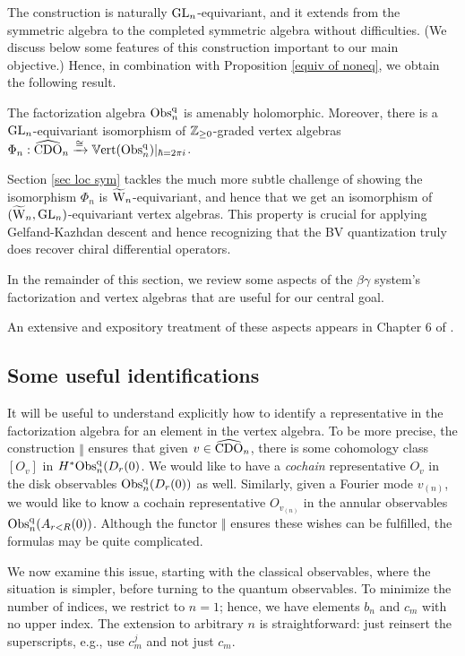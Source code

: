 The construction is naturally ${\rm GL}_n$-equivariant, and 
it extends from the symmetric algebra to the completed symmetric algebra without difficulties.
(We discuss below some features of this construction important to our main objective.)
Hence, in combination with Proposition \ref{equiv of noneq},
we obtain the following result.

\begin{cor}
The factorization algebra ${\rm Obs}^{\rm q}_n$ is amenably holomorphic. 
Moreover, there is a ${\rm GL}_n$-equivariant isomorphism of $\mathbb Z_{\geq 0}$-graded vertex algebras 
$\Phi_n : \widehat{\rm CDO}_n \xrightarrow{\cong} \mathbb{V}{\rm ert}({\rm Obs}^{\rm q}_n)|_{\hbar= 2 \pi i}$.
\end{cor}

Section \ref{sec loc sym} tackles the much more subtle challenge of showing the isomorphism $\Phi_n$ is $\widetilde{{{\rm W}}}_n$-equivariant,
and hence that we get an isomorphism of $(\widetilde{{{\rm W}}}_n,{\rm GL}_n)$-equivariant vertex algebras.
This property is crucial for applying Gelfand-Kazhdan descent 
and hence recognizing that the BV quantization truly does recover chiral differential operators.

In the remainder of this section, we review some aspects of the $\beta\gamma$ system's factorization
and vertex algebras that are useful for our central goal.

\begin{rmk}
An extensive and expository treatment of these aspects appears in Chapter 6 of \cite{GwThesis}.
\end{rmk}

\subsection{Some useful identifications}
\label{identifications}

It will be useful to understand explicitly how to identify a representative in the factorization algebra for an element in the vertex algebra.
To be more precise, the construction $\Vert$ ensures that given $v \in \widehat{\rm CDO}_n$, there is some cohomology class $[O_v]$ in $H^* {\rm Obs}^{\rm q}_n(D_r(0)$.
We would like to have a {\em cochain} representative $O_v$ in the disk observables ${\rm Obs}^{\rm q}_n(D_r(0))$ as well.
Similarly, given a Fourier mode $v_{(n)}$, 
we would like to know a cochain representative $O_{v_{(n)}}$ in the annular observables ${\rm Obs}^{\rm q}_n(A_{r<R}(0))$.
Although the functor $\Vert$ ensures these wishes can be fulfilled,
the formulas may be quite complicated.

We now examine this issue, starting with the classical observables, where the situation is simpler,
before turning to the quantum observables.
To minimize the number of indices, we restrict to $n = 1$; 
hence, we have elements $b_n$ and $c_m$ with no upper index. 
The extension to arbitrary $n$ is straightforward:
just reinsert the superscripts, e.g., use $c^j_m$ and not just $c_m$.


